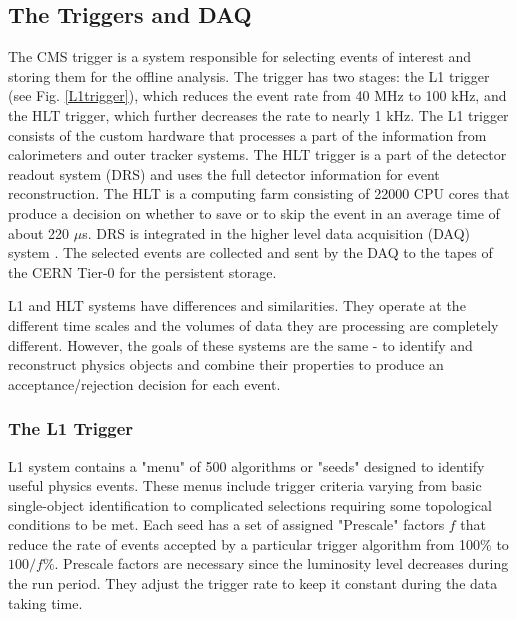 \begin{normalsize}

\subsection{The Triggers and DAQ}

The CMS trigger \cite{Trigger} is a system responsible for selecting events of interest and storing them for the offline analysis. The trigger has two stages: the L1 trigger (see Fig. \ref{L1trigger}), which reduces the event rate from 40 MHz to 100 kHz, and the HLT trigger, which further decreases the rate to nearly 1 kHz. The L1 trigger consists of the custom hardware that processes a part of the information from calorimeters and outer tracker systems. The HLT trigger is a part of the detector readout system (DRS) and uses the full detector information for event reconstruction. The HLT is a computing farm consisting of 22000 CPU cores that produce a decision on whether to save or to skip the event in an average time of about 220 $\mu$s. DRS is integrated in the higher level data acquisition (DAQ) system \cite{DAQ}. The selected events are collected and sent by the DAQ to the tapes of the CERN Tier-0 for the persistent storage. 


L1 and HLT systems have differences and similarities. They operate at the different time scales and the volumes of data they are processing are completely different. However, the goals of these systems are the same - to identify and reconstruct physics objects and combine their properties to produce an acceptance/rejection decision for each event. 



\subsubsection{The L1 Trigger}


L1 system \cite{CMS_TDR} contains a "menu" of 500 algorithms or "seeds" designed to identify useful physics events. These menus include trigger criteria varying from basic single-object identification to complicated selections requiring some topological conditions to be met. Each seed has a set of assigned "Prescale" factors $f$ that reduce the rate of events accepted by a particular trigger algorithm from 100$\%$ to $100/f\%$. Prescale factors are necessary since the luminosity level decreases during the run period. They adjust the trigger rate to keep it constant during the data taking time. 


\end{normalsize}
